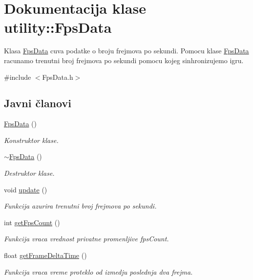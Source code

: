 \hypertarget{classutility_1_1FpsData}{}\section{Dokumentacija klase utility\+:\+:Fps\+Data}
\label{classutility_1_1FpsData}


Klasa \hyperlink{classutility_1_1FpsData}{Fps\+Data} cuva podatke o broju frejmova po sekundi. Pomocu klase \hyperlink{classutility_1_1FpsData}{Fps\+Data} racunamo trenutni broj frejmova po sekundi pomocu kojeg sinhronizujemo igru.  




{\ttfamily \#include $<$Fps\+Data.\+h$>$}

\subsection*{Javni članovi}
\begin{DoxyCompactItemize}
\item 
\hyperlink{classutility_1_1FpsData_a74340a4b4ca45996749c4393fdf6d9b2}{Fps\+Data} ()
\begin{DoxyCompactList}\small\item\em Konstruktor klase. \end{DoxyCompactList}\item 
\hyperlink{classutility_1_1FpsData_a99d760610ab41e30cf0d1150f60b9332}{$\sim$\+Fps\+Data} ()
\begin{DoxyCompactList}\small\item\em Destruktor klase. \end{DoxyCompactList}\item 
void \hyperlink{classutility_1_1FpsData_adcc115a219b00aa4d0c979955b617f91}{update} ()
\begin{DoxyCompactList}\small\item\em Funkcija azurira trenutni broj frejmova po sekundi. \end{DoxyCompactList}\item 
int \hyperlink{classutility_1_1FpsData_abd745ff03d01035ff7a5453558469c2c}{get\+Fps\+Count} ()
\begin{DoxyCompactList}\small\item\em Funkcija vraca vrednost privatne promenljive fps\+Count. \end{DoxyCompactList}\item 
float \hyperlink{classutility_1_1FpsData_afe3b4f2272afb4efcc628a5947cf5383}{get\+Frame\+Delta\+Time} ()
\begin{DoxyCompactList}\small\item\em Funkcija vraca vreme proteklo od izmedju poslednja dva frejma. \end{DoxyCompactList}\end{DoxyCompactItemize}
